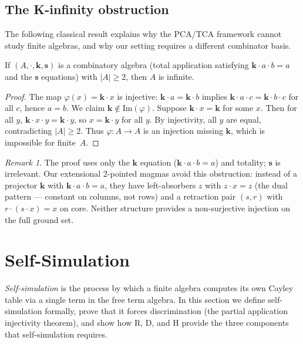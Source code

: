 \documentclass[sigconf,screen,review,anonymous]{acmart}
\newcommand{\dotop}{\cdot}
\theoremstyle{remark}
\newtheorem{remark}{Remark}
\begin{document}
\subsection{The K-infinity obstruction}

The following classical result explains why the PCA/TCA framework cannot study finite algebras, and why our setting requires a different combinator basis.

\begin{theorem}[K-infinity]
\label{thm:k-infinity}
If $(A, \dotop, \mathbf{k}, \mathbf{s})$ is a combinatory algebra (total application satisfying $\mathbf{k} \dotop a \dotop b = a$ and the $\mathbf{s}$ equations) with $|A| \geq 2$, then $A$ is infinite.
\end{theorem}

\begin{proof}
The map $\varphi(x) = \mathbf{k} \dotop x$ is injective: $\mathbf{k} \dotop a = \mathbf{k} \dotop b$ implies $\mathbf{k} \dotop a \dotop c = \mathbf{k} \dotop b \dotop c$ for all $c$, hence $a = b$. We claim $\mathbf{k} \notin \mathrm{Im}(\varphi)$. Suppose $\mathbf{k} \dotop x = \mathbf{k}$ for some $x$. Then for all $y$, $\mathbf{k} \dotop x \dotop y = \mathbf{k} \dotop y$, so $x = \mathbf{k} \dotop y$ for all $y$. By injectivity, all $y$ are equal, contradicting $|A| \geq 2$. Thus $\varphi : A \to A$ is an injection missing $\mathbf{k}$, which is impossible for finite~$A$.
\end{proof}

\begin{remark}
The proof uses only the $\mathbf{k}$ equation ($\mathbf{k} \dotop a \dotop b = a$) and totality; $\mathbf{s}$ is irrelevant. Our extensional 2-pointed magmas avoid this obstruction: instead of a projector $\mathbf{k}$ with $\mathbf{k} \dotop a \dotop b = a$, they have left-absorbers $z$ with $z \dotop x = z$ (the dual pattern --- constant on columns, not rows) and a retraction pair $(s, r)$ with $r \dotop (s \dotop x) = x$ on core. Neither structure provides a non-surjective injection on the full ground set.
\end{remark}

\section{Self-Simulation}
\label{sec:selfsim}

\emph{Self-simulation} is the process by which a finite algebra computes its own Cayley table via a single term in the free term algebra. In this section we define self-simulation formally, prove that it forces discrimination (the partial application injectivity theorem), and show how R, D, and H provide the three components that self-simulation requires.
\end{document}
